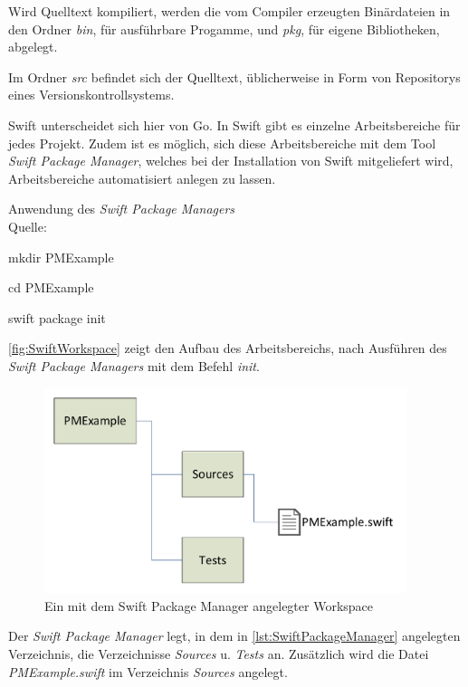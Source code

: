 Wird Quelltext kompiliert, werden die vom Compiler erzeugten Binärdateien in den Ordner \textit{bin}, für ausführbare Progamme, und \textit{pkg}, für eigene Bibliotheken, abgelegt.

Im Ordner \textit{src} befindet sich der Quelltext, üblicherweise in Form von Repositorys eines Versionskontrollsystems.

Swift unterscheidet sich hier von Go. 
In Swift gibt es einzelne Arbeitsbereiche für jedes Projekt. 
Zudem ist es möglich, sich diese Arbeitsbereiche mit dem Tool \textit{Swift Package Manager}, welches bei der Installation von Swift mitgeliefert wird, Arbeitsbereiche automatisiert anlegen zu lassen.

\begin{listing}[H]
\caption{Anwendung des \textit{Swift Package Managers} \\ Quelle:\cite[S.22]{Hoffman.2017}}
\label{lst:SwiftPackageManager}
\begin{Commandline}
mkdir PMExample

cd PMExample

swift package init
\end{Commandline}
\end{listing}

\autoref{fig:SwiftWorkspace} zeigt den Aufbau des Arbeitsbereichs, nach Ausführen des \textit{Swift Package Managers} mit dem Befehl \textit{init}. 

\begin{figure}[H]
    \centering
    \includegraphics[height=6cm]{Images/SwiftWorkspace}
    \caption{Ein mit dem Swift Package Manager angelegter Workspace}
    \label{fig:SwiftWorkspace}
\end{figure}

Der \textit{Swift Package Manager} legt, in dem in \autoref{lst:SwiftPackageManager} angelegten Verzeichnis, die Verzeichnisse \textit{Sources} u. \textit{Tests} an.
Zusätzlich wird die Datei \textit{PMExample.swift} im Verzeichnis \textit{Sources} angelegt.

